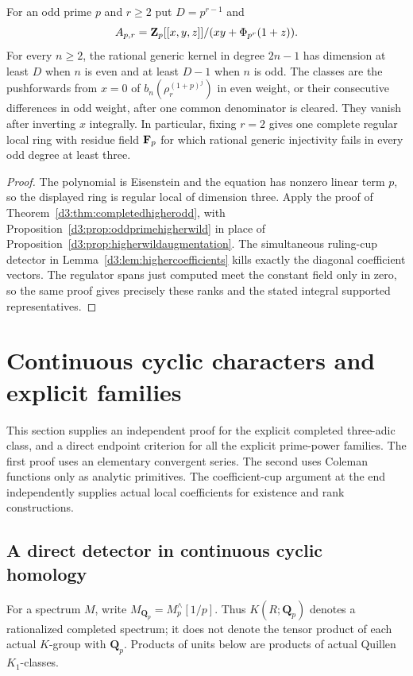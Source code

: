 \begin{corollary}
\label{d3:cor:oddprimecompletedhigher}
For an odd prime $p$ and $r\geq2$ put $D=p^{r-1}$ and
\[
 A_{p,r}=\mathbf Z_p[[x,y,z]]/(xy+\Phi_{p^r}(1+z)).
\]
For every $n\geq2$, the rational generic kernel in degree $2n-1$
has dimension at least $D$ when $n$ is even and at least $D-1$
when $n$ is odd. The classes are the pushforwards from $x=0$ of
$b_n(\rho_r^{(1+p)^j})$ in even weight, or their consecutive
differences in odd weight, after one common denominator is cleared.
They vanish after inverting $x$ integrally.
In particular, fixing $r=2$ gives one complete regular local ring
with residue field $\mathbf F_p$ for which rational generic injectivity
fails in every odd degree at least three.
\end{corollary}
\begin{proof}
The polynomial is Eisenstein and the equation has nonzero linear
term $p$, so the displayed ring is regular local of dimension three.
Apply the proof of Theorem~\ref{d3:thm:completedhigherodd}, with
Proposition~\ref{d3:prop:oddprimehigherwild} in place of
Proposition~\ref{d3:prop:higherwildaugmentation}.
The simultaneous ruling-cup detector in
Lemma~\ref{d3:lem:highercoefficients} kills exactly the diagonal
coefficient vectors. The regulator spans just computed meet the
constant field only in zero, so the same proof gives precisely
these ranks and the stated integral supported representatives.
\end{proof}

\section{Continuous cyclic characters and explicit families}\label{d3:sec:directcyclic}

This section supplies an independent proof for the explicit completed
three-adic class, and a direct endpoint criterion for all the explicit
prime-power families. The first proof uses an elementary convergent
series. The second uses Coleman functions only as analytic primitives.
The coefficient-cup argument at the end independently supplies actual
local coefficients for existence and rank constructions.

\subsection{A direct detector in continuous cyclic homology}
\label{d3:sec:directtcdetector}

For a spectrum $M$, write $M_{\mathbf Q_p}=M^{\wedge}_p[1/p]$.
Thus $K(R;\mathbf Q_p)$ denotes a rationalized completed spectrum;
it does not denote the tensor product of each actual $K$-group with
$\mathbf Q_p$. Products of units below are products of actual
Quillen $K_1$-classes.

